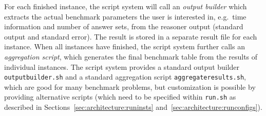 \documentclass[a4paper]{article}
\begin{document}
		For each finished instance, the script system will call an \emph{output builder}
		which extracts the actual benchmark parameters the user is interested in,
		e.g.~time information and number of answer sets,
		from the reasoner output (standard output and standard error).
		The result is stored in a separate result file for each instance.
		When all instances have finished, the script system further calls an \emph{aggregation script},
		which generates the final benchmark table from the results of individual instances.
		The script system provides a standard output builder {\tt outputbuilder.sh} and a standard aggregation script {\tt aggregateresults.sh},
		which are good for many benchmark problems, but customization is possible by providing alternative scripts
		(which need to be specified within {\tt run.sh} as described in Sections~\ref{sec:architecture:runinsts} and~\ref{sec:architecture:runconfigs}).
\end{document}
